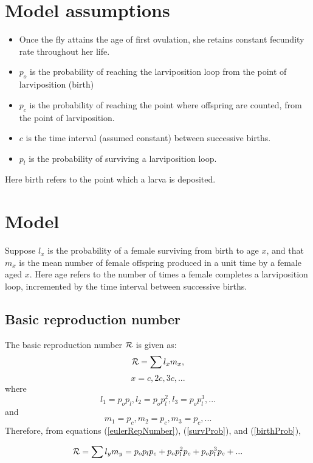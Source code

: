 \documentclass[12pt,a4paper]{article}
\begin{document}
\section*{Model assumptions} 
\begin{itemize} 
	\item  Once the fly attains the age of first ovulation, she retains constant fecundity rate throughout her life.   
	\item  $p_o$ is the probability of reaching the larviposition loop from the point of larviposition (birth)
	\item   $p_c$ is the probability of reaching the point where offspring are counted, from the point of larviposition.
	\item   $c$ is the time interval (assumed constant) between successive births. 
	\item   $p_l$ is the probability of surviving a larviposition loop.
\end{itemize}
 Here birth refers to the point which a larva is deposited. 

\section*{Model} 

Suppose  $l_{x}$ is the probability of a female surviving from birth to age $x$, and that $m_{x}$ is the mean number of female offspring produced in a unit time by a female aged $x$. Here age refers to the number of times a female completes a larviposition loop, incremented by the time interval between successive births. 

\subsection*{Basic reproduction number}

The basic reproduction number ${\cal R}$ is given as:
$${\cal R}=\sum l_{x}m_{x},$$
$$x=c,2c,3c,... $$
where
\begin{equation}
\label{survProb} 
l_{1}=p_op_l, l_{2}= p_op_l^2, l_{3}=p_op_l^3, . . .
\end{equation}
and
\begin{equation}
\label{birthProb} 
m_{1}=p_c, m_{2}=p_c, m_{3}=p_c, . . .
\end{equation}
Therefore, from equations (\ref{eulerRepNumber}),  (\ref{survProb}), and  (\ref{birthProb}),

$${\cal R}=\sum l_{y}m_{y} = p_op_lp_c + p_op_l^2 p_c + p_op_l^3p_c + ...$$
\end{document}
